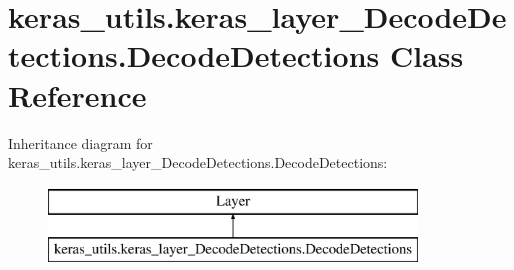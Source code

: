 \hypertarget{classkeras__utils_1_1keras__layer___decode_detections_1_1_decode_detections}{}\section{keras\+\_\+utils.\+keras\+\_\+layer\+\_\+\+Decode\+Detections.\+Decode\+Detections Class Reference}
\label{classkeras__utils_1_1keras__layer___decode_detections_1_1_decode_detections}
Inheritance diagram for keras\+\_\+utils.\+keras\+\_\+layer\+\_\+\+Decode\+Detections.\+Decode\+Detections\+:\begin{figure}[H]
\begin{center}
\leavevmode
\includegraphics[height=2.000000cm]{classkeras__utils_1_1keras__layer___decode_detections_1_1_decode_detections}
\end{center}
\end{figure}
